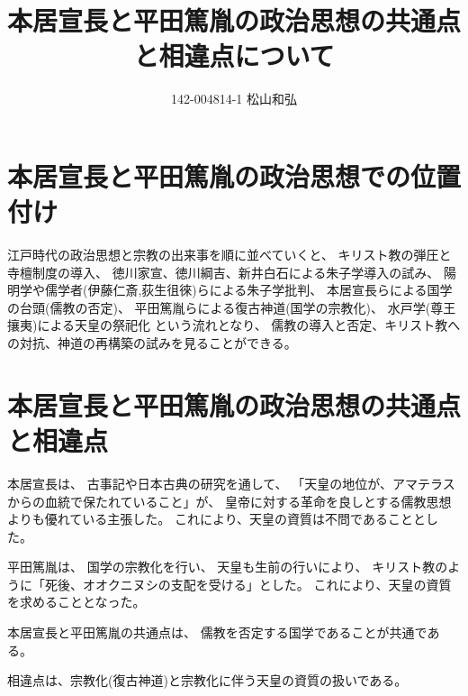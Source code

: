 \documentclass{jsarticle}
\begin{document}
\title{本居宣長と平田篤胤の政治思想の共通点と相違点について}
\author{142-004814-1 松山和弘}
\maketitle

\section{本居宣長と平田篤胤の政治思想での位置付け}

江戸時代の政治思想と宗教の出来事を順に並べていくと、
キリスト教の弾圧と寺檀制度の導入、
徳川家宣、徳川綱吉、新井白石による朱子学導入の試み、
陽明学や儒学者(伊藤仁斎,荻生徂徠)らによる朱子学批判、
本居宣長らによる国学の台頭(儒教の否定)、
平田篤胤らによる復古神道(国学の宗教化)、
水戸学(尊王攘夷)による天皇の祭祀化
という流れとなり、
儒教の導入と否定、キリスト教への対抗、神道の再構築の試みを見ることができる。

\section{本居宣長と平田篤胤の政治思想の共通点と相違点}

本居宣長は、
古事記や日本古典の研究を通して、
「天皇の地位が、アマテラスからの血統で保たれていること」が、
皇帝に対する革命を良しとする儒教思想よりも優れている主張した。
これにより、天皇の資質は不問であることとした。

平田篤胤は、
国学の宗教化を行い、
天皇も生前の行いにより、
キリスト教のように「死後、オオクニヌシの支配を受ける」とした。
これにより、天皇の資質を求めることとなった。

本居宣長と平田篤胤の共通点は、
儒教を否定する国学であることが共通である。

相違点は、宗教化(復古神道)と宗教化に伴う天皇の資質の扱いである。
\end{document}
